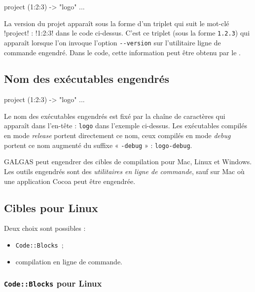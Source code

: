 
\begin{galgas3}
project (1:2:3) -> "logo" {
  ...
}
\end{galgas3}

La version du projet apparaît sous la forme d'un triplet qui suit le mot-clé \ggst!project! : \ggst!1:2:3! dans le code ci-dessus. C'est ce triplet (sous la forme \texttt{1.2.3}) qui apparaît lorsque l'on invoque l'option \texttt{-{}-version} sur l'utilitaire ligne de commande engendré.
Dans le code, cette information peut être obtenu par le .


\subsection{Nom des exécutables engendrés}

\begin{galgas3}
project (1:2:3) -> "logo" {
  ...
}
\end{galgas3}

Le nom des exécutables engendrés est fixé par la chaîne de caractères qui apparaît dans l'en-tête : \texttt{logo} dans l'exemple ci-dessus. Les exécutables compilés en mode \emph{release} portent directement ce nom, ceux compilés en mode \emph{debug} portent ce nom augmenté du suffixe « \texttt{-debug} » : \texttt{logo-debug}.



GALGAS peut engendrer des cibles de compilation pour Mac, Linux et Windows. Les outils engendrés sont des \emph{utilitaires en ligne de commande}, sauf sur Mac où une application Cocoa peut être engendrée.

\subsection{Cibles pour Linux}

Deux choix sont possibles :
\begin{itemize}
\item \texttt{Code{}::Blocks}~;
\item compilation en ligne de commande.
\end{itemize}

\subsubsection{\texttt{Code{}::Blocks} pour Linux}

